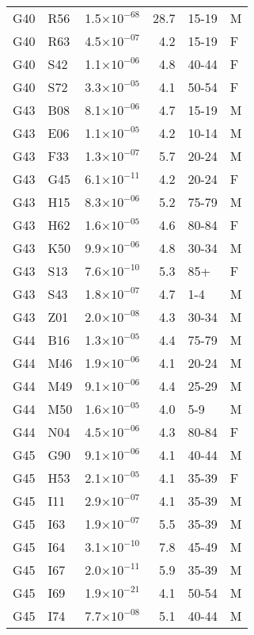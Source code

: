 \begin{longtable}{lllrll}
   G40 & R56 & 1.5$\times10^{-68}$ & 28.7 & 15-19 & M \\ 
   G40 & R63 & 4.5$\times10^{-07}$ & 4.2 & 15-19 & F \\ 
   G40 & S42 & 1.1$\times10^{-06}$ & 4.8 & 40-44 & F \\ 
   G40 & S72 & 3.3$\times10^{-05}$ & 4.1 & 50-54 & F \\ 
   G43 & B08 & 8.1$\times10^{-06}$ & 4.7 & 15-19 & M \\ 
   G43 & E06 & 1.1$\times10^{-05}$ & 4.2 & 10-14 & M \\ 
   G43 & F33 & 1.3$\times10^{-07}$ & 5.7 & 20-24 & M \\ 
   G43 & G45 & 6.1$\times10^{-11}$ & 4.2 & 20-24 & F \\ 
   G43 & H15 & 8.3$\times10^{-06}$ & 5.2 & 75-79 & M \\ 
   G43 & H62 & 1.6$\times10^{-05}$ & 4.6 & 80-84 & F \\ 
   G43 & K50 & 9.9$\times10^{-06}$ & 4.8 & 30-34 & M \\ 
   G43 & S13 & 7.6$\times10^{-10}$ & 5.3 & 85+ & F \\ 
   G43 & S43 & 1.8$\times10^{-07}$ & 4.7 & 1-4 & M \\ 
   G43 & Z01 & 2.0$\times10^{-08}$ & 4.3 & 30-34 & M \\ 
   G44 & B16 & 1.3$\times10^{-05}$ & 4.4 & 75-79 & M \\ 
   G44 & M46 & 1.9$\times10^{-06}$ & 4.1 & 20-24 & M \\ 
   G44 & M49 & 9.1$\times10^{-06}$ & 4.4 & 25-29 & M \\ 
   G44 & M50 & 1.6$\times10^{-05}$ & 4.0 & 5-9 & M \\ 
   G44 & N04 & 4.5$\times10^{-06}$ & 4.3 & 80-84 & F \\ 
   G45 & G90 & 9.1$\times10^{-06}$ & 4.1 & 40-44 & M \\ 
   G45 & H53 & 2.1$\times10^{-05}$ & 4.1 & 35-39 & F \\ 
   G45 & I11 & 2.9$\times10^{-07}$ & 4.1 & 35-39 & M \\ 
   G45 & I63 & 1.9$\times10^{-07}$ & 5.5 & 35-39 & M \\ 
   G45 & I64 & 3.1$\times10^{-10}$ & 7.8 & 45-49 & M \\ 
   G45 & I67 & 2.0$\times10^{-11}$ & 5.9 & 35-39 & M \\ 
   G45 & I69 & 1.9$\times10^{-21}$ & 4.1 & 50-54 & M \\ 
   G45 & I74 & 7.7$\times10^{-08}$ & 5.1 & 40-44 & M \\ 

\end{longtable}
